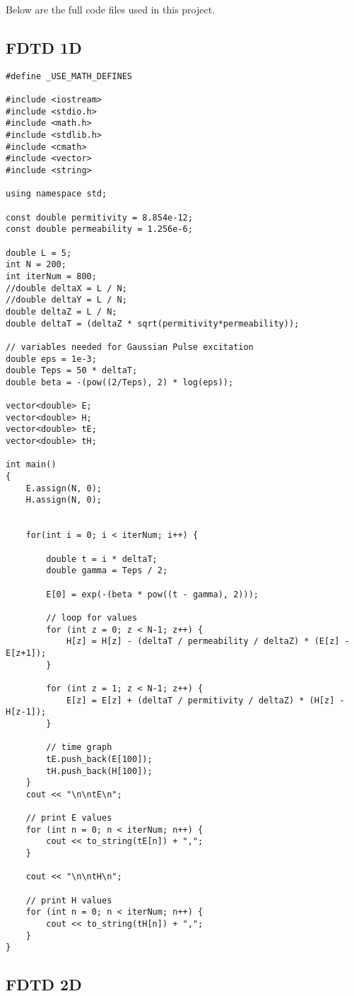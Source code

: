 Below are the full code files used in this project.

\subsection{FDTD 1D}
\begin{verbatim}
#define _USE_MATH_DEFINES

#include <iostream>
#include <stdio.h>
#include <math.h>
#include <stdlib.h>
#include <cmath>
#include <vector>
#include <string>

using namespace std;

const double permitivity = 8.854e-12;
const double permeability = 1.256e-6;

double L = 5;
int N = 200;
int iterNum = 800;
//double deltaX = L / N;
//double deltaY = L / N;
double deltaZ = L / N;
double deltaT = (deltaZ * sqrt(permitivity*permeability));

// variables needed for Gaussian Pulse excitation
double eps = 1e-3;
double Teps = 50 * deltaT;
double beta = -(pow((2/Teps), 2) * log(eps));

vector<double> E;
vector<double> H;
vector<double> tE;
vector<double> tH;

int main()
{
	E.assign(N, 0);
	H.assign(N, 0);
	
	
	for(int i = 0; i < iterNum; i++) {
		
		double t = i * deltaT;
		double gamma = Teps / 2;
		
		E[0] = exp(-(beta * pow((t - gamma), 2)));
		
		// loop for values
		for (int z = 0; z < N-1; z++) {
			H[z] = H[z] - (deltaT / permeability / deltaZ) * (E[z] - E[z+1]);
		}
		
		for (int z = 1; z < N-1; z++) {
			E[z] = E[z] + (deltaT / permitivity / deltaZ) * (H[z] - H[z-1]);
		}
		
		// time graph
		tE.push_back(E[100]);
		tH.push_back(H[100]);
	}
	cout << "\n\ntE\n";
	
	// print E values
	for (int n = 0; n < iterNum; n++) {
		cout << to_string(tE[n]) + ",";
	}
	
	cout << "\n\ntH\n";
	
	// print H values
	for (int n = 0; n < iterNum; n++) {
		cout << to_string(tH[n]) + ",";
	}
}	
\end{verbatim}

\subsection{FDTD 2D}

